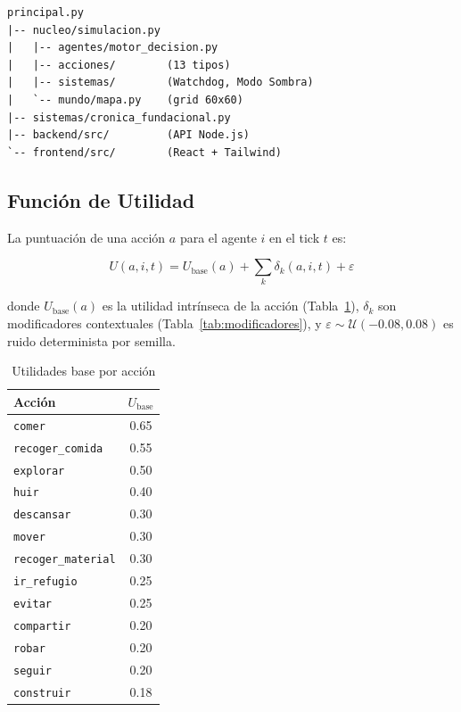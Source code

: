 \documentclass[11pt,a4paper,twocolumn]{article}
\begin{document}
\begin{lstlisting}[label=lst:arch, caption={\'Arbol de m\'odulos principal}]
principal.py
|-- nucleo/simulacion.py
|   |-- agentes/motor_decision.py
|   |-- acciones/        (13 tipos)
|   |-- sistemas/        (Watchdog, Modo Sombra)
|   `-- mundo/mapa.py    (grid 60x60)
|-- sistemas/cronica_fundacional.py
|-- backend/src/         (API Node.js)
`-- frontend/src/        (React + Tailwind)
\end{lstlisting}

\subsection{Funci\'on de Utilidad}

La puntuaci\'on de una acci\'on $a$ para el agente $i$ en el tick $t$ es:

\begin{equation}
  U(a,i,t) = U_{\text{base}}(a) + \sum_{k} \delta_k(a,i,t) + \varepsilon
  \label{eq:utility}
\end{equation}

donde $U_{\text{base}}(a)$ es la utilidad intr\'inseca de la acci\'on
(Tabla~\ref{tab:ubase}), $\delta_k$ son modificadores contextuales
(Tabla~\ref{tab:modificadores}), y
$\varepsilon \sim \mathcal{U}(-0.08, 0.08)$ es ruido determinista
por semilla.

\begin{table}[h]
  \centering
  \caption{Utilidades base por acci\'on}
  \label{tab:ubase}
  \small
  \begin{tabular}{lc}
    \toprule
    \textbf{Acci\'on} & $U_{\text{base}}$ \\
    \midrule
    \texttt{comer}             & 0.65 \\
    \texttt{recoger\_comida}   & 0.55 \\
    \texttt{explorar}          & 0.50 \\
    \texttt{huir}              & 0.40 \\
    \texttt{descansar}         & 0.30 \\
    \texttt{mover}             & 0.30 \\
    \texttt{recoger\_material} & 0.30 \\
    \texttt{ir\_refugio}       & 0.25 \\
    \texttt{evitar}            & 0.25 \\
    \texttt{compartir}         & 0.20 \\
    \texttt{robar}             & 0.20 \\
    \texttt{seguir}            & 0.20 \\
    \texttt{construir}         & 0.18 \\
    \bottomrule
  \end{tabular}
\end{table}
\end{document}
